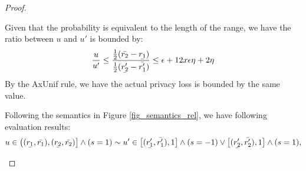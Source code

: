 \documentclass[a4paper,11pt]{article}
\begin{document}
\begin{proof}
\begin{itemize}
{		%
		Given that the probability is equivalent to the length of the range, we have the ratio between $u$ and $u'$ is bounded by:
		\[
		\frac{u}{u'} 
		\leq \frac
		{\frac{1}{2}(\bar{\rval_2} - \ubar{\rval_1})}
		{\frac{1}{2}(\ubar{\rval_2'} - \bar{\rval_1'})}
		\leq \epsilon + 12 x \epsilon \eta + 2\eta
		\]
		By the {AxUnif} rule, we have the actual privacy loss is bounded by the same value.
		}		

		Following the semantics in Figure \ref{fig_semantics_rel}, we have following evaluation results:
		\[
		u \in 
		\big( 
		(\ubar{\rval_1}, \bar{\rval_1}),
		(\ubar{\rval_2}, \bar{\rval_2})
		\big] \land (s = 1)
		\sim u' \in 
		\big[ (\ubar{\rval_1'}, \bar{\rval_1'}), 1 \big] \land (s = -1)
		\lor
		\big[ (\ubar{\rval_2'}, \bar{\rval_2'}), 1 \big] \land (s = 1),
		\]
		\todo{
		where $\ubar{\rval_1}, \bar{\rval_1}, \ubar{\rval_2}, \bar{\rval_2}, \ubar{\rval_1'}, \bar{\rval_1'}, \ubar{\rval_2'} and \bar{\rval_2'}$ have following values:
		Given that the probability is equivalent to the length of the range, we have the ratio between $u$ and $u'$ is bounded by:
		\[
		\frac{u}{u'} 
		\leq \frac
		{\frac{1}{2}(\bar{\rval_2} - \ubar{\rval_1})}
		{1 - \frac{1}{2}(\bar{\rval_2'} + \bar{\rval_1'})}
		\leq \epsilon + 12 x \epsilon \eta + 2\eta
		\]
		By the {AxUnif} rule, we have the actual privacy loss is bounded by the same value.
		}


\end{itemize}
\end{proof}
\end{document}
